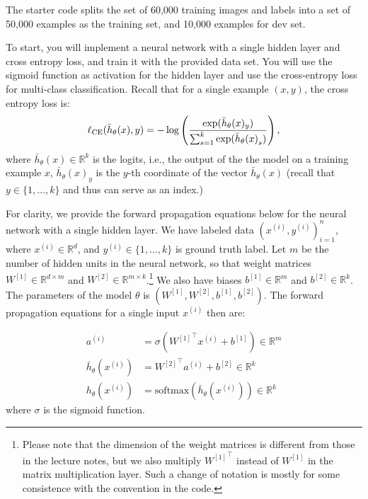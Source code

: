 The starter code splits the set
of 60,000 training images and labels into a set of 50,000 examples as
the training set, and 10,000 examples for dev set.

To start, you will implement a neural network with a single hidden layer
and cross entropy loss, and train it with the provided data set. You will use the
sigmoid function as activation for the hidden layer and use the cross-entropy loss for multi-class classification. Recall that for a single example $(x, y)$, the cross
entropy loss is:
$$\ell_\textup{CE}(\bar{h}_{\theta}(x),y) = - \log\left(\frac{\exp(\bar{h}_{\theta}(x)_{y})}{\sum_{s=1}^{k}\exp({\bar{h}_{\theta}(x)}_s)}\right),$$
where $\bar{h}_{\theta}(x) \in \mathbb{R}^{k}$ is the logits, i.e., the output of the the model on a training example $x$, $\bar{h}_\theta(x)_y$ is the $y$-th coordinate of the vector $\bar{h}_\theta(x)$ (recall that $y\in \{1,\dots, k\}$ and thus can serve as an index.) %



For clarity, we provide the forward propagation equations below for the neural network with a single hidden layer. We have labeled data $(x^{(i)}, y^{(i)})_{i=1}^n$, where $x^{(i)} \in \mathbb{R}^d$, and $y^{(i)} \in \{1,\dots, k\}$ is ground truth label. Let $m$ be the number of hidden units in the neural network, so that weight matrices $W^{[1]} \in \mathbb{R}^{d \times m}$ and $W^{[2]} \in \mathbb{R}^{m \times k}$.\footnote{Please note that the dimension of the weight matrices is different from those in the lecture notes, but we also multiply ${W^{[1]}}^\top$ instead of $W^{[1]}$ in the matrix multiplication layer.  Such a change of notation is mostly for some consistence with the convention in the code.} We also have biases $b^{[1]} \in \mathbb{R}^m$ and $b^{[2]} \in \mathbb{R}^k$. The parameters of the model $\theta$ is $(W^{[1]},W^{[2]},b^{[1]},b^{[2]})$. The forward propagation equations for a single input $x^{(i)}$ then are:

\begin{align*}
  a^{(i)} &= \sigma \left( {W^{[1]}}^\top x^{(i)}  + b^{[1]} \right)  \in \mathbb{R}^m \\
  \bar{h}_{\theta}(x^{(i)})&= {W^{[2]}}^\top a^{(i)} + b^{[2]} \in \mathbb{R}^k \\
  {h}_{\theta}(x^{(i)}) &=  \mathrm{softmax}(\bar{h}_{\theta}(x^{(i)})) \in \mathbb{R}^k
\end{align*}
where $\sigma$ is the sigmoid function. 

